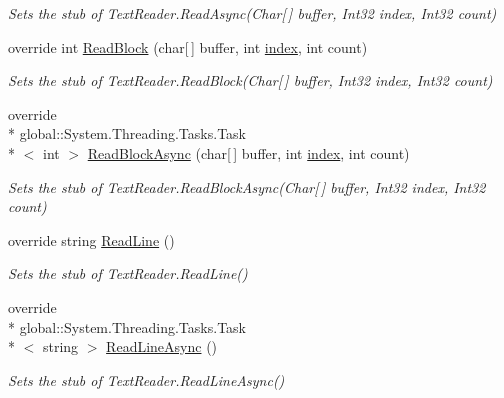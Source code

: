 \begin{DoxyCompactItemize}
\begin{DoxyCompactList}\small\item\em Sets the stub of Text\-Reader.\-Read\-Async(\-Char\mbox{[}$\,$\mbox{]} buffer, Int32 index, Int32 count)\end{DoxyCompactList}\item 
override int \hyperlink{class_system_1_1_i_o_1_1_fakes_1_1_stub_text_reader_a78792c19d91687bf36d6668e21bf4bdb}{Read\-Block} (char\mbox{[}$\,$\mbox{]} buffer, int \hyperlink{jquery-1_810_82-vsdoc_8js_a75bb12d1f23302a9eea93a6d89d0193e}{index}, int count)
\begin{DoxyCompactList}\small\item\em Sets the stub of Text\-Reader.\-Read\-Block(\-Char\mbox{[}$\,$\mbox{]} buffer, Int32 index, Int32 count)\end{DoxyCompactList}\item 
override \\*
global\-::\-System.\-Threading.\-Tasks.\-Task\\*
$<$ int $>$ \hyperlink{class_system_1_1_i_o_1_1_fakes_1_1_stub_text_reader_a12b929cef7170f11c5692cd34d6cb3fa}{Read\-Block\-Async} (char\mbox{[}$\,$\mbox{]} buffer, int \hyperlink{jquery-1_810_82-vsdoc_8js_a75bb12d1f23302a9eea93a6d89d0193e}{index}, int count)
\begin{DoxyCompactList}\small\item\em Sets the stub of Text\-Reader.\-Read\-Block\-Async(\-Char\mbox{[}$\,$\mbox{]} buffer, Int32 index, Int32 count)\end{DoxyCompactList}\item 
override string \hyperlink{class_system_1_1_i_o_1_1_fakes_1_1_stub_text_reader_a3702b96033a498ec99f75df3e9458357}{Read\-Line} ()
\begin{DoxyCompactList}\small\item\em Sets the stub of Text\-Reader.\-Read\-Line()\end{DoxyCompactList}\item 
override \\*
global\-::\-System.\-Threading.\-Tasks.\-Task\\*
$<$ string $>$ \hyperlink{class_system_1_1_i_o_1_1_fakes_1_1_stub_text_reader_abfdef725a20ee787cd57d961242a36ac}{Read\-Line\-Async} ()
\begin{DoxyCompactList}\small\item\em Sets the stub of Text\-Reader.\-Read\-Line\-Async()\end{DoxyCompactList}\item 

\end{DoxyCompactItemize}
